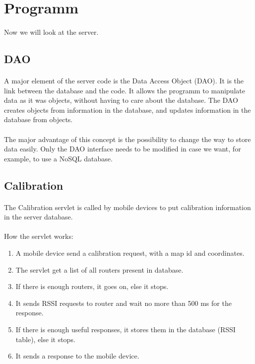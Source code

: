     \section{Programm}

\paragraph{}
Now we will look at the server.

        \subsection{DAO}

\paragraph{}
A major element of the server code is the Data Access Object (DAO). It is the
link between the database and the code. It allows the programm to manipulate
data as it was objects, without having to care about the database. The DAO
creates objects from information in the database, and updates information in the
database from objects.

\paragraph{}
The major advantage of this concept is the possibility to change the way to
store data easily. Only the DAO interface needs to be modified in case we want,
for example, to use a NoSQL database.

        \subsection{Calibration}

\paragraph{}
The Calibration servlet is called by mobile devices to put calibration information
in the server database.

\paragraph{}
How the servlet works:
\begin{enumerate}
    \item A mobile device send a calibration request, with a map id and
        coordinates.
    \item The servlet get a list of all routers present in database.
    \item If there is enough routers, it goes on, else it stops.
    \item It sends RSSI requests to router and wait no more than 500 ms for the
        response.
    \item If there is enough useful responses, it stores them in the database
        (RSSI table), else it stops.
    \item It sends a response to the mobile device.
\end{enumerate}


